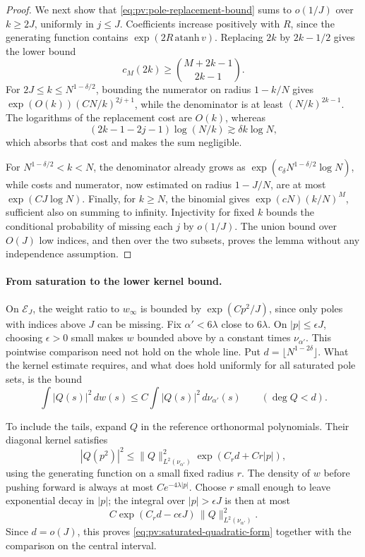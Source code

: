 \begin{proof}
We next show that \eqref{eq:pv:pole-replacement-bound} sums to \(o(1/J)\) over \(k\ge2J\), uniformly in \(j\le J\). Coefficients increase positively with \(R\), since the generating function contains \(\exp(2R\,\mathrm{atanh}\,v)\). Replacing \(2k\) by \(2k-1/2\) gives the lower bound
\[
 c_M(2k)\ge\binom{M+2k-1}{2k-1}.
\]
For \(2J\le k\le N^{1-\delta/2}\), bounding the numerator on radius \(1-k/N\) gives \(\exp(O(k))(CN/k)^{2j+1}\), while the denominator is at least \((N/k)^{2k-1}\). The logarithms of the replacement cost are \(O(k)\), whereas
\[
 (2k-1-2j-1)\log(N/k)\gtrsim\delta k\log N,
\]
which absorbs that cost and makes the sum negligible.

For \(N^{1-\delta/2}<k<N\), the denominator already grows as \(\exp(c_\delta N^{1-\delta/2}\log N)\), while costs and numerator, now estimated on radius \(1-J/N\), are at most \(\exp(CJ\log N)\). Finally, for \(k\ge N\), the binomial gives \(\exp(cN)(k/N)^M\), sufficient also on summing to infinity. Injectivity for fixed \(k\) bounds the conditional probability of missing each \(j\) by \(o(1/J)\). The union bound over \(O(J)\) low indices, and then over the two subsets, proves the lemma without any independence assumption.
\end{proof}

\paragraph{From saturation to the lower kernel bound.}
On \(\mathcal E_J\), the weight ratio to \(w_\infty\) is bounded by \(\exp(Cp^2/J)\), since only poles with indices above \(J\) can be missing. Fix \(\alpha'<6\lambda\) close to \(6\lambda\). On \(|p|\le\epsilon J\), choosing \(\epsilon>0\) small makes \(w\) bounded above by a constant times \(\nu_{\alpha'}\). This pointwise comparison need not hold on the whole line. Put \(d=\lfloor N^{1-2\delta}\rfloor\). What the kernel estimate requires, and what does hold uniformly for all saturated pole sets, is the bound
\begin{equation}\label{eq:pv:saturated-quadratic-form}
 \int |Q(s)|^2\,dw(s)
 \le C\int |Q(s)|^2\,d\nu_{\alpha'}(s)
 \qquad(\deg Q<d).
\end{equation}

To include the tails, expand \(Q\) in the reference orthonormal polynomials. Their diagonal kernel satisfies
\[
 |Q(p^2)|^2
 \le \|Q\|_{L^2(\nu_{\alpha'})}^2
       \exp(C_r d+Cr|p|),
\]
using the generating function on a small fixed radius \(r\). The density of \(w\) before pushing forward is always at most \(Ce^{-4\lambda|p|}\). Choose \(r\) small enough to leave exponential decay in \(|p|\); the integral over \(|p|>\epsilon J\) is then at most
\[
 C\exp(C_r d-c\epsilon J)\,\|Q\|_{L^2(\nu_{\alpha'})}^2.
\]
Since \(d=o(J)\), this proves \eqref{eq:pv:saturated-quadratic-form} together with the comparison on the central interval.


